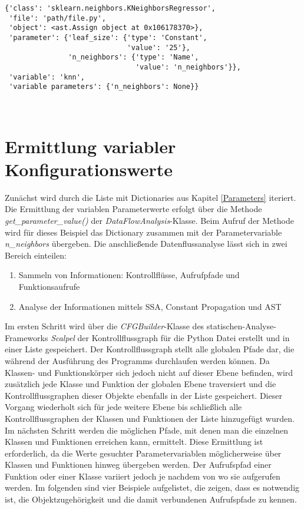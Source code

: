 \documentclass[german,bachelor]{swsLeipzig}
\begin{document}
\noindent\begin{minipage}{\linewidth}
\begin{lstlisting}[frame=single, label=param_dict, basicstyle=\small, caption={Dictionary-Eintrag der KNeighborsRegressor-Klasse inklusive Parameter},captionpos=b]
{'class': 'sklearn.neighbors.KNeighborsRegressor',
 'file': 'path/file.py',
 'object': <ast.Assign object at 0x106178370>},
 'parameter': {'leaf_size': {'type': 'Constant',
                             'value': '25'},
               'n_neighbors': {'type': 'Name',
                               'value': 'n_neighbors'}},
 'variable': 'knn',
 'variable parameters': {'n_neighbors': None}}
\end{lstlisting}
\end{minipage}
\

\section{Ermittlung variabler Konfigurationswerte}\label{dataflow}
Zunächst wird durch die Liste mit Dictionaries aus Kapitel \ref{Parameters} iteriert.
Die Ermittlung der variablen Parameterwerte erfolgt über die Methode \textit{get\_parameter\_value()} der \textit{DataFlowAnalysis}-Klasse.
Beim Aufruf der Methode wird für dieses Beispiel das Dictionary zusammen mit der Parametervariable \textit{n\_neighbors} übergeben.
Die anschließende Datenflussanalyse lässt sich in zwei Bereich einteilen:

\begin{enumerate}
 \item Sammeln von Informationen: Kontrollflüsse, Aufrufpfade und Funktionsaufrufe
 \item Analyse der Informationen mittels SSA, Constant Propagation und AST
\end{enumerate}

Im ersten Schritt wird über die \textit{CFGBuilder}-Klasse des statischen-Analyse-Frameworks \textit{Scalpel} der
Kontrollflussgraph für die Python Datei erstellt und in einer Liste gespeichert.
Der Kontrollflussgraph stellt alle globalen Pfade dar, die während der Ausführung des Programms durchlaufen werden können.
Da Klassen- und Funktionskörper sich jedoch nicht auf dieser Ebene befinden, wird zusätzlich jede Klasse und Funktion
der globalen Ebene traversiert und die Kontrollflussgraphen dieser Objekte ebenfalls in der Liste gespeichert.
Dieser Vorgang wiederholt sich für jede weitere Ebene bis schließlich alle Kontrollflussgraphen der
Klassen und Funktionen der Liste hinzugefügt wurden. \\
\indent Im nächsten Schritt werden die möglichen Pfade, mit denen man die einzelnen Klassen und Funktionen erreichen kann, ermittelt.
Diese Ermittlung ist erforderlich, da die Werte gesuchter Parametervariablen möglicherweise über Klassen und Funktionen hinweg
übergeben werden.
Der Aufrufspfad einer Funktion oder einer Klasse variiert jedoch je nachdem von wo sie aufgerufen werden.
Im folgenden sind vier Beispiele aufgelistet, die zeigen, dass es notwendig ist, die Objektzugehörigkeit und die damit
verbundenen Aufrufspfade zu kennen.
\end{document}
